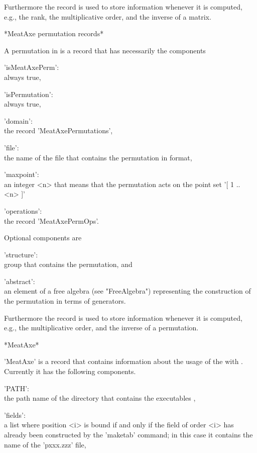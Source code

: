 Furthermore the record is used to store information whenever it is 
computed, e.g., the rank, the multiplicative order, and the inverse
of a {\MeatAxe} matrix.

\vspace{5mm}

*MeatAxe permutation records*

A {\MeatAxe} permutation in {\GAP} is a record that has necessarily
the components

'isMeatAxePerm':\\ always true,

'isPermutation':\\ always true,

'domain':\\ the record 'MeatAxePermutations',

'file':\\  the name of the file that contains the permutation in
           {\MeatAxe} format,

'maxpoint': \\ an integer <n> that means that the permutation acts on
               the point set '[ 1 .. <n> ]'

'operations':\\ the record 'MeatAxePermOps'.

Optional components are

'structure':\\ group that contains the permutation, and

'abstract':\\  an element of a free algebra (see "FreeAlgebra")
               representing the construction of the permutation in terms of
               generators.

Furthermore the record is used to store information whenever it is 
computed, e.g., the multiplicative order, and the inverse
of a {\MeatAxe} permutation.

\vspace{5mm}

*MeatAxe*

'MeatAxe' is a record that contains information about the usage of the
{\MeatAxe} with {\GAP}.  Currently it has the following components.

'PATH':\\     the path name of the directory that contains the {\MeatAxe}
              executables ,

'fields':\\   a list where position <i> is bound if and only if
            the field of order <i> has already been constructed by
            the 'maketab' command; in this case it contains the
            name of the 'pxxx.zzz' file,

